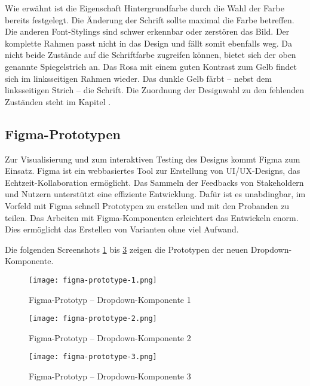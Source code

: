 Wie erwähnt ist die Eigenschaft Hintergrundfarbe durch die Wahl der Farbe bereits festgelegt. 
Die Änderung der Schrift sollte maximal die Farbe betreffen. 
Die anderen Font-Stylings sind schwer erkennbar oder zerstören das Bild. 
Der komplette Rahmen passt nicht in das Design und fällt somit ebenfalls weg. 
Da nicht beide Zustände auf die Schriftfarbe zugreifen können, bietet sich der oben genannte Spiegelstrich an. 
Das Rosa mit einem guten Kontrast zum Gelb findet sich im linksseitigen Rahmen wieder. 
Das dunkle Gelb färbt – nebst dem linksseitigen Strich – die Schrift. 
Die Zuordnung der Designwahl zu den fehlenden Zuständen steht im Kapitel \textbf{}. 


\clearpage
\subsection{Figma-Prototypen}
\label{sec:figmaPrototype}

Zur Visualisierung und zum interaktiven Testing des Designs kommt Figma zum Einsatz. 
Figma ist ein webbasiertes Tool zur Erstellung von UI/UX-Designs, das Echtzeit-Kollaboration ermöglicht. 
Das Sammeln der Feedbacks von Stakeholdern und Nutzern unterstützt eine effiziente Entwicklung. 
Dafür ist es unabdingbar, im Vorfeld mit Figma schnell Prototypen zu erstellen und mit den Probanden zu teilen. 
Das Arbeiten mit Figma-Komponenten erleichtert das Entwickeln enorm. 
Dies ermöglicht das Erstellen von Varianten ohne viel Aufwand. 

Die folgenden Screenshots \ref{img:figmaPrototype1} bis \ref{img:figmaPrototype3} zeigen die Prototypen der neuen Drop\-down-Kom\-po\-nente. 

\begin{figure}[!htb]
    \centering
    \texttt{[image: figma-prototype-1.png]}
    \caption{\centering Figma-Prototyp – Dropdown-Komponente 1}
    \label{img:figmaPrototype1}
\end{figure}

\begin{figure}[!htb]
    \centering
    \texttt{[image: figma-prototype-2.png]}
    \caption{\centering Figma-Prototyp – Dropdown-Komponente 2}
    \label{img:figmaPrototype2}
\end{figure}

\begin{figure}[!htb]
    \centering
    \texttt{[image: figma-prototype-3.png]}
    \caption{\centering Figma-Prototyp – Dropdown-Komponente 3}
    \label{img:figmaPrototype3}
\end{figure}

